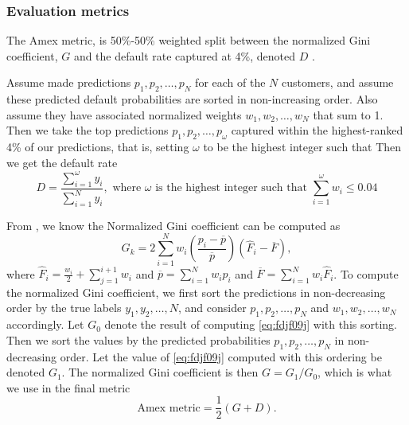 \documentclass{statsmsc}
\begin{document}
{\subsubsection{Evaluation metrics}%
\label{ssub:Evaluation metrics}

The Amex metric, is 50\%-50\% weighted split between the normalized Gini coefficient, $G$ and
the default rate captured at 4\%, denoted $D$ \citep{amex-data}.

Assume made predictions $p_1,p_2,\dots,p_N$ for each of the $N$ customers, and assume these
predicted default probabilities are sorted in non-increasing order. Also assume they have
associated normalized weights $w_1,w_2,\dots,w_N$ that sum to 1.
Then we take the top predictions $p_1,p_2,\dots,p_\omega$
captured within the highest-ranked 4\% of our predictions, that is, setting $\omega$ to be
the highest integer such that
Then we get the default rate
\begin{equation}
    D= \frac{\sum^{\omega}_{i=1} y_i}{\sum^{N}_{i=1} y_i},
    \textrm{ where } \omega \textrm{ is the highest integer such that }
    \sum^{\omega}_{i=1} w_i \leq 0.04 %
\end{equation}

From \cite{gini}, we know the Normalized Gini coefficient can be computed as
\begin{equation}\label{eq:fdjf09j}
    G_k=2  \sum^{N}_{i=1} w_i \left(\frac{p_i - \overline{p}}{\overline{p}}\right)
    \left(\hat{F}_i - \overline{F} \right),
\end{equation}
where $\hat{F}_i=\frac{w_i}{2} +\sum^{i+1}_{j=1} w_i$ and $\overline{p}=\sum^{N}_{i=1} w_i p_i$ and
$\overline{F}=\sum^{N}_{i=1} w_i \hat{F}_i$.
To compute the normalized Gini coefficient, we first sort the predictions in non-decreasing order
by the true labels $y_1,y_2,\dots,N$, and consider $p_1,p_2,\dots,p_N$ and $w_1,w_2,\dots,w_N$
accordingly. Let $G_0$ denote the result of computing \cref{eq:fdjf09j} with this sorting.
Then we sort the values by the predicted probabilities $p_1,p_2,\dots,p_N$ in non-decreasing order.
Let the value of \cref{eq:fdjf09j} computed with this ordering be denoted $G_1$.
The normalized Gini coefficient is then $G=G_1/G_0$, which is what we use in the final metric
\begin{equation}
    \textrm{Amex metric}=\frac{1}{2} \left(G +D \right).
\end{equation}

}
\end{document}
